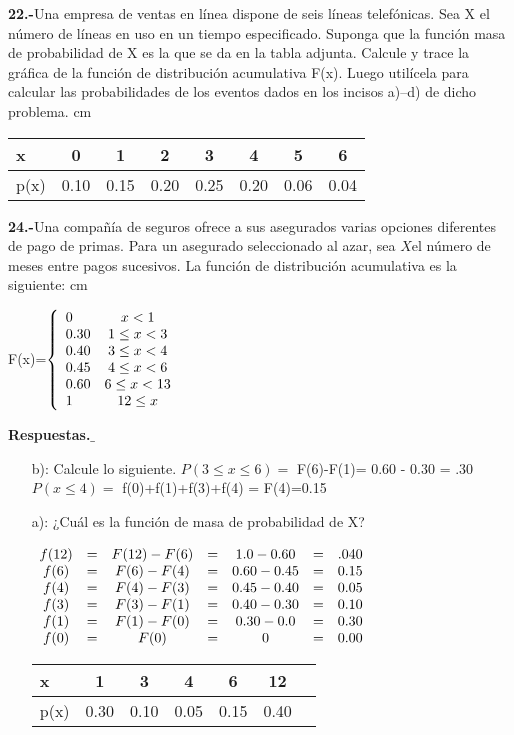 \documentclass[12pt, letterpaper, spanish]{article}
\newcommand{\jump}{\vskip 0.01cm}
\begin{document}
\textbf{22.-}Una empresa de ventas en línea dispone de seis líneas telefónicas. Sea X el número de líneas en uso en un tiempo especificado. Suponga que la función masa de probabilidad de X es la que se da en la tabla adjunta. Calcule y trace la gráfica de la función de distribución acumulativa F(x). Luego utilícela para calcular las probabilidades de los eventos dados en los incisos a)–d) de dicho problema.  cm
\begin{tabular}{l|c c c c c c c}
    x&0&1&2&3&4&5&6\\
    \hline
    p(x)&0.10&0.15&0.20&0.25&0.20&0.06&0.04\\
\end{tabular}\vskip0.5cm

\textbf{24.-}Una compañía de seguros ofrece a sus asegurados varias opciones diferentes de pago de primas. Para un asegurado seleccionado al azar, sea $X$el número de meses entre pagos sucesivos. La función de distribución acumulativa es la siguiente: cm
\begin{center}
F(x)=$\left\{\begin{array}{l c}
    0 & x<1\\
    0.30 & 1 \leq x < 3\\
    0.40 & 3 \leq x < 4\\
    0.45 & 4 \leq x < 6\\
    0.60 & 6 \leq x < 13\\
    1    & 12 \leq x
\end{array}\right.$
\end{center} \jump
\textbf{Respuestas.$\_$}\jump
\begin{itemize}
    \item[b):] Calcule lo siguiente.
    \jump $P(3\leq x \leq 6) =$ F(6)-F(1)= 0.60 - 0.30 = .30
    \jump $P(x \leq 4) =$ f(0)+f(1)+f(3)+f(4) = F(4)=0.15
    \item[a):] ¿Cuál es la función de masa de probabilidad de X?
    \jump \begin{center} $\begin{array}{c c c c c c c}
        f(12)&=&F(12)-F(6)&=&1.0 - 0.60&=&.040\\
        f(6)&=&F(6)-F(4)&=&0.60 - 0.45&=&0.15\\
        f(4)&=&F(4)-F(3)&=&0.45 - 0.40&=&0.05\\
        f(3)&=&F(3)-F(1)&=&0.40 - 0.30&=&0.10\\
        f(1)&=&F(1)-F(0)&=&0.30 - 0.0&=&0.30\\
        f(0)&=&F(0)&=&0 &=&0.00\\
    \end{array}$  \jump
    \begin{tabular}{l|c c c c c c}
        x&1&3&4&6&12\\
        \hline
        p(x)&0.30&0.10&0.05&0.15&0.40\\
    \end{tabular}
\end{center}
\end{itemize}
\end{document}

